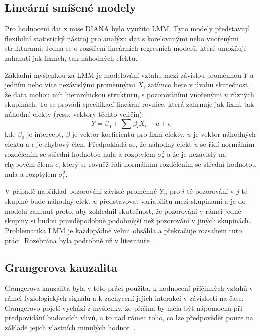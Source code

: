 \subsection{Lineární smíšené modely}
\label{subsec:lmm}
Pro hodnocení dat z mise DIANA bylo využito \gls{LMM}. Tyto modely představují
flexibilní statistický nástroj pro analýzu dat s korelovanými nebo vnořenými
strukturami. Jedná se o rozšíření lineárních regresních modelů, které umožňují
zahrnutí jak fixních, tak náhodných efektů.

Základní myšlenkou za LMM je modelování vztahu mezi závislou proměnnou $Y$ a
jedním nebo více nezávislými proměnnými $X$, zatímco bere v úvahu skutečnost, že
data mohou mít hierarchickou strukturu, s pozorováními vnořenými v různých
skupinách. To se provádí specifikací lineární rovnice, která zahrnuje jak fixní,
tak náhodné efekty (resp. vektory těchto veličin):
\begin{equation}
    Y = \beta_0 + \sum \beta_i X_i + u + \epsilon
\end{equation}
kde $\beta_0$ je intercept, $\beta$ je vektor koeficientů pro fixní efekty, $u$
je vektor náhodných efektů a $\epsilon$ je chybový člen. Předpokládá se, že
náhodný efekt $u$ se řídí normálním rozdělením se střední hodnotou nula a
rozptylem $\sigma_u^2$ a že je nezávislý na chybovém členu $\epsilon$, který se
rovněž řídí normálním rozdělením se střední hodnotou nula a rozptylem
$\sigma_\epsilon^2$.

V případě například pozorování závislé proměnné $Y_{ij}$ pro $i$-té pozorování v
$j$-té skupině bude náhodný efekt $u$ představovat variabilitu mezi skupinami a
je do modelu zahrnut proto, aby zohlednil skutečnost, že pozorování v rámci
jedné skupiny si budou pravděpodobně podobnější než pozorování v jiných
skupinách. Problematika \gls{LMM} je každopádně velmi obsáhla a překračuje
rozsahem tuto práci. Rozebrána byla podrobně už v literatuře~\cite{West2022}.

\subsection{Grangerova kauzalita}
\label{subsec:granger}
Grangerova kauzalita byla v této práci použita, k hodnocení příčinných vztahů v
rámci fyziologických signálů a k zachycení jejich interakcí v závislosti na
čase. Grangerovo pojetí vychází z myšlenky, že příčina by měla být nápomocná při
předpovídání budoucích vlivů, a to nad rámec toho, co lze předpovědět pouze na
základě jejich vlastních minulých hodnot~\cite{Granger1969}.

